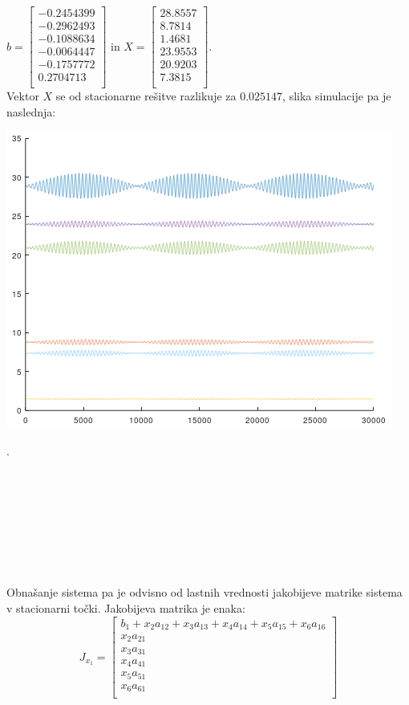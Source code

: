 \documentclass[a4paper, 12pt]{article}
\begin{document}
$ b =
\begin{bmatrix}
	-0.2454399 \\
	-0.2962493 \\
	-0.1088634 \\
	-0.0064447 \\
	-0.1757772 \\
	0.2704713 \\
\end{bmatrix} $ in
$ X =
\begin{bmatrix}
	28.8557 \\
	8.7814 \\
	1.4681 \\
	23.9553 \\
	20.9203 \\
	7.3815 \\
\end{bmatrix} $. \\
Vektor $ X $ se od stacionarne rešitve razlikuje za $ 0.025147 $, slika simulacije pa je naslednja:
\begin{center}
	\includegraphics{cycle.png}
\end{center}
.
\\
\\
\\
\\
\\
\\
\\
\\
\\
Obnašanje sistema pa je odvisno od lastnih vrednosti jakobijeve matrike sistema
v stacionarni točki. Jakobijeva matrika je enaka:
\begin{equation}
	J_{x_{1}} =
	\begin{bmatrix}
		b_{1}+x_{2}a_{12}+x_{3}a_{13}+x_{4}a_{14}+x_{5}a_{15}+x_{6}a_{16} \\
		x_{2}a_{21} \\
		x_{3}a_{31} \\
		x_{4}a_{41} \\
		x_{5}a_{51} \\
		x_{6}a_{61} \\
	\end{bmatrix}
\end{equation}
\end{document}
